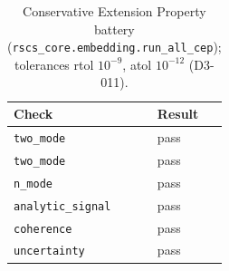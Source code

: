 \begin{table}[H]\centering
\caption{Conservative Extension Property battery (\texttt{rscs\_core.embedding.run\_all\_cep}); tolerances rtol $10^{-9}$, atol $10^{-12}$ (D3-011).}\label{tab:cep}
\begin{tabular}{@{}l l@{}}\toprule Check & Result \\ \midrule
\texttt{two\_mode} & pass \\
\texttt{two\_mode} & pass \\
\texttt{n\_mode} & pass \\
\texttt{analytic\_signal} & pass \\
\texttt{coherence} & pass \\
\texttt{uncertainty} & pass \\
\bottomrule\end{tabular}\end{table}
